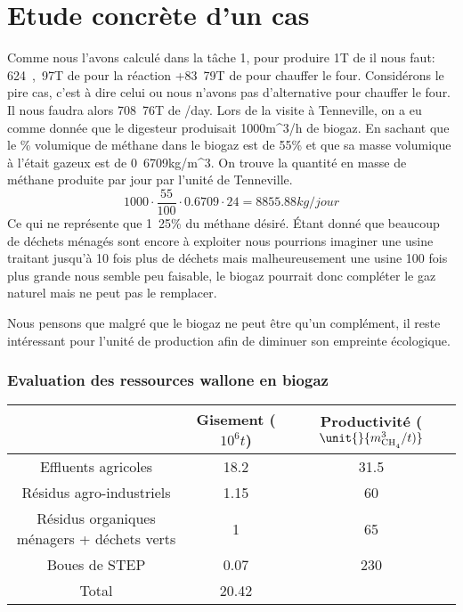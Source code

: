 \documentclass[10pt,a4paper]{article}
\begin{document}
\section{Etude concrète d'un cas}
Comme nous l'avons calculé dans la tâche 1, pour produire \unit{1}{T} de  il nous faut: \unit{624,97}{T} de  pour la réaction +\unit{83.79}{T} de  pour chauffer le four. Considérons le pire cas, c'est à dire celui ou nous n'avons pas d'alternative pour chauffer le four. 
Il nous faudra alors \unit{708.76}{T} de /day.
Lors de la visite à Tenneville, on a eu comme donnée que le digesteur produisait \unit{1000}{m^3/h} de biogaz. En sachant que le \% volumique de méthane dans le biogaz est de \unit{55}{\%} et que sa masse volumique à l'était gazeux est de \unit{0.6709}{kg/m^3}. On trouve la quantité en masse de méthane produite par jour par l'unité de Tenneville.
\begin{equation}
1000\cdot \dfrac{55}{100}\cdot 0.6709\cdot 24 = \unit{8855.88}{kg/jour}
\end{equation}
Ce qui ne représente que \unit{1.25}{\%} du méthane désiré.
Étant donné que beaucoup de déchets ménagés sont encore à exploiter nous pourrions imaginer une usine traitant jusqu'à 10 fois plus de déchets mais malheureusement une usine 100 fois plus grande nous semble peu faisable, le biogaz pourrait donc compléter le gaz naturel mais ne peut pas le remplacer.

Nous pensons que malgré que le biogaz ne peut être qu'un complément, il reste intéressant pour l'unité de production afin de diminuer son empreinte écologique.

\subsubsection{Evaluation des ressources wallone en biogaz}
\begin{center}
\begin{tabular}{|c|c|c|}
\hline 
 & Gisement ($\unit{10^6}{t}$) & Productivité ($\unit{}{m^3_{\ce{CH4}}/t)}$\\ 
\hline 
Effluents agricoles & 18.2 & 31.5  \\ 
\hline 
Résidus agro-industriels & 1.15 & 60 \\ 
\hline 
Résidus organiques ménagers + déchets verts & 1 & 65\\ 
\hline 
Boues de STEP& 0.07 & 230 \\ 
\hline 
Total & 20.42 & \\ 
\hline 
\end{tabular} 

\end{center}
\end{document}
